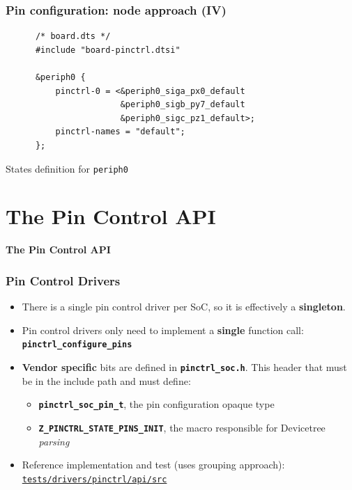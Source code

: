 \documentclass[handout]{beamer}
\begin{document}
\begin{frame}[fragile]
  \frametitle{Pin configuration: node approach (IV)}

  \begin{listing}[H]
    \begin{verbatim}
      /* board.dts */
      #include "board-pinctrl.dtsi"
  
      &periph0 {
          pinctrl-0 = <&periph0_siga_px0_default
                       &periph0_sigb_py7_default
                       &periph0_sigc_pz1_default>;
          pinctrl-names = "default";
      };
    \end{verbatim}
    \caption{States definition for \texttt{periph0}}
  \end{listing}
\end{frame}


\section{The Pin Control API}

\begin{frame}
  \begin{center}
    \Huge \textbf{The Pin Control API}
  \end{center}
\end{frame}

\begin{frame}
  \frametitle{Pin Control Drivers}

  \begin{itemize}
    \item<1-> There is a single pin control driver per SoC, so it is effectively
          a \textbf{singleton}.
    \item<2-> Pin control drivers only need to implement a \textbf{single}
          function call: \textbf{\texttt{pinctrl\_configure\_pins}}
    \item<3-> \textbf{Vendor specific} bits are defined in
          \textbf{\texttt{pinctrl\_soc.h}}. This header that must be in the
          include path and must define:
          \begin{itemize}
            \item \textbf{\texttt{pinctrl\_soc\_pin\_t}}, the pin configuration
                  opaque type
            \item \textbf{\texttt{Z\_PINCTRL\_STATE\_PINS\_INIT}}, the macro
                  responsible for Devicetree \textit{parsing}
          \end{itemize}
    \item<4-> Reference implementation and test (uses grouping approach):
          \href{https://github.com/zephyrproject-rtos/zephyr/tree/main/tests/drivers/pinctrl/api/src}{\texttt{tests/drivers/pinctrl/api/src}}
  \end{itemize}
\end{frame}
\end{document}
